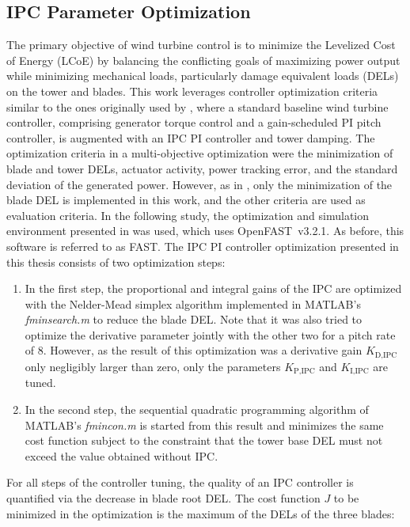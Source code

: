 \subsection{IPC Parameter Optimization} \label{subsection: IPCOptCriteria}
The primary objective of wind turbine control is to minimize the Levelized Cost of Energy (LCoE) by balancing the conflicting goals of maximizing power output while minimizing mechanical loads, particularly damage equivalent loads (DELs) on the tower and blades. This work leverages controller optimization criteria similar to the ones originally used by \cite{hoffmann2018load}, where a standard baseline wind turbine controller, comprising generator torque control and a gain-scheduled PI pitch controller, is augmented with an IPC PI controller and tower damping. The optimization criteria in a multi-objective optimization were the minimization of blade and tower DELs, actuator activity, power tracking error, and the standard deviation of the generated power. However, as in \cite{dittmer2024combined}, only the minimization of the blade DEL is implemented in this work, and the other criteria are used as evaluation criteria. In the following study, the optimization and simulation environment presented in \cite{dittmer2024combined} was used, which uses OpenFAST~v3.2.1. As before, this software is referred to as FAST.
%
The IPC PI controller optimization presented in this thesis consists of two optimization steps:
\begin{enumerate}
    \item In the first step, the proportional and integral gains of the IPC are optimized with the Nelder-Mead simplex algorithm implemented in MATLAB's \textit{fminsearch.m} to reduce the blade DEL. Note that it was also tried to optimize  the derivative parameter jointly with the other two for a pitch rate of 8\textdegree. However, as the result of this optimization was a derivative gain $K_{\text{D,IPC}}$ only negligibly larger than zero, only the parameters $K_{\text{P,IPC}}$ and $K_{\text{I,IPC}}$ are tuned.
    \item In the second step, the sequential quadratic programming algorithm of MATLAB's \textit{fmincon.m} is started from this result and minimizes the same cost function subject to the constraint that the tower base DEL must not exceed the value obtained without IPC.
\end{enumerate}
For all steps of the controller tuning, the quality of an IPC controller is quantified via the decrease in blade root DEL. The cost function $J$ to be minimized in the optimization is the maximum of the DELs of the three blades:

